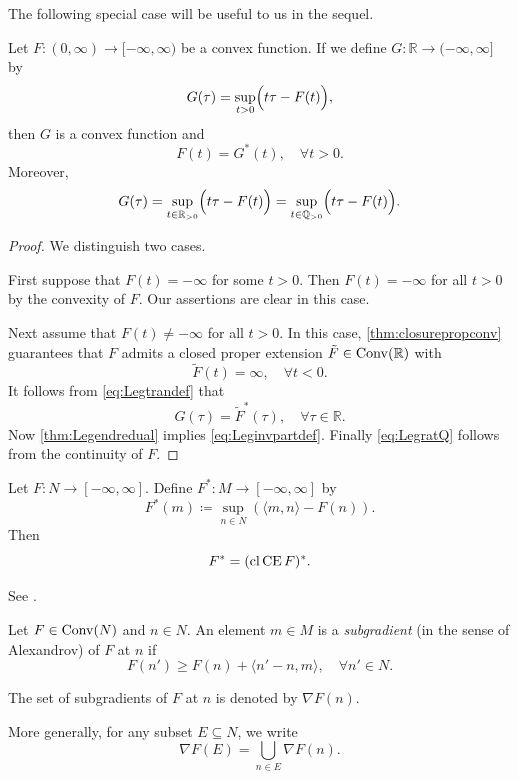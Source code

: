 The following special case will be useful to us in the sequel.
\begin{corollary}\label{cor:Leginvpartdef}
    Let $F\colon (0,\infty)\rightarrow [-\infty,\infty)$ be a convex function. If we define $G\colon \mathbb{R}\rightarrow (-\infty,\infty]$ by
    \[
        G(\tau)=\sup_{t>0} \Bigl( t\tau-F(t) \Bigr),
    \]
    then $G$ is a convex function and
    \begin{equation}\label{eq:Leginvpartdef}
    F(t)=G^*(t),\quad \forall t>0.
    \end{equation}
    Moreover,
    \begin{equation}\label{eq:LegratQ}
        G(\tau)=\sup_{t\in \mathbb{R}_{>0}} \Bigl( t\tau-F(t) \Bigr)=\sup_{t\in \mathbb{Q}_{>0}} \Bigl( t\tau-F(t) \Bigr).
    \end{equation}
\end{corollary}
\begin{proof}
    We distinguish two cases.

    First suppose that $F(t)=-\infty$ for some $t>0$. Then $F(t)=-\infty$ for all $t>0$ by the convexity of $F$. Our assertions are clear in this case.

    Next assume that $F(t)\neq -\infty$ for all $t>0$. In this case, \cref{thm:closurepropconv} guarantees that $F$ admits a closed proper extension $\tilde{F}\in \mathrm{Conv}(\mathbb{R})$ with
    \[
    \tilde{F}(t)=\infty,\quad \forall t<0.
    \]
    It follows from \eqref{eq:Legtrandef} that
    \[
    G(\tau)=\tilde{F}^*(\tau),\quad \forall \tau\in \mathbb{R}.
    \]
    Now \cref{thm:Legendredual} implies \eqref{eq:Leginvpartdef}. Finally \eqref{eq:LegratQ} follows from the continuity of $F$.
\end{proof}


\begin{proposition}\label{prop:Legnonconvex}
    Let $F\colon N\rightarrow [-\infty,\infty]$. Define $F^*\colon M\rightarrow [-\infty,\infty]$ by
    \[
    F^*(m)\coloneqq \sup_{n\in N} \left( \langle m,n \rangle -F(n) \right).
    \]
    Then
    \[
    F^*=(\operatorname{cl} \operatorname{CE} F)^*.
    \]
\end{proposition}
See \cite[Corollary~12.1.1]{Roc70}.

\begin{definition}\label{def:subgrad}
    Let $F\in \mathrm{Conv}(N)$ and $n\in N$. An element $m\in M$ is a \emph{subgradient} (in the sense of Alexandrov) of $F$ at $n$ if
    \begin{equation}\label{eq:subgrad}
    F(n')\geq F(n)+\langle n'-n,m \rangle,\quad \forall n'\in N.
    \end{equation}

    The set of subgradients of $F$ at $n$ is denoted by $\nabla F(n)$.

    More generally, for any subset $E\subseteq N$, we write
    \[
        \nabla F(E)=\bigcup_{n\in E}\nabla F(n).
    \]
\end{definition}

